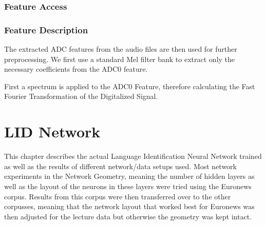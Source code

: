 \subsection{Feature Access}
\label{sec:FP:FA}

\subsection{Feature Description}
\label{sec:FP:FD}
The extracted ADC features from the audio files are then used for further preprocessing. We first use a standard Mel filter bank to extract only the necessary coefficients from the ADC0 feature. 

First a spectrum is applied to the ADC0 Feature, therefore calculating the Fast Fourier Transformation of the Digitalized Signal.


\chapter{LID Network}
\label{ch:LIDNetwork}

This chapter describes the actual Language Identification Neural Network trained as well as the results of different network/data setups used. Most network experiments in the Network Geometry, meaning the number of hidden layers as well as the layout of the neurons in these layers were tried using the Euronews corpus. Results from this corpus were then transferred over to the other corpusses, meaning that the network layout that worked best for Euronews was then adjusted for the lecture data but otherwise the geometry was kept intact.


	
